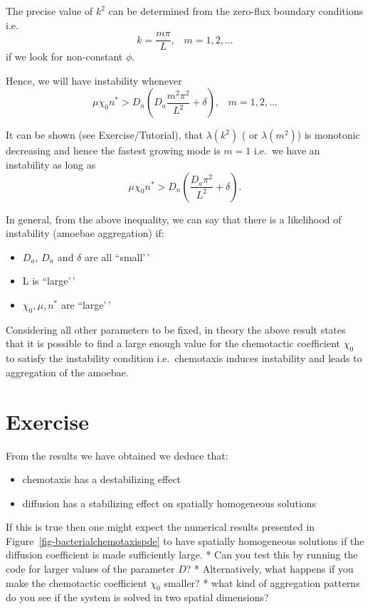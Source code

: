 \documentclass[
  letterpaper,
  DIV=11,
  numbers=noendperiod]{scrreprt}
\providecommand{\tightlist}{%
  \setlength{\itemsep}{0pt}\setlength{\parskip}{0pt}}\usepackage{longtable,booktabs,array}
\theoremstyle{definition}
\theoremstyle{plain}
\theoremstyle{plain}
\theoremstyle{remark}
\begin{document}
The precise value of \(k^2\) can be determined from the zero-flux
boundary conditions i.e. \[ 
k  =  \frac{m \pi}{L}, \;\;\; m = 1,2, \dots 
\] if we look for non-constant \(\phi\).

Hence, we will have instability whenever \[
\mu \chi_0 n^* >  D_n  \left( D_a \frac{m^2 \pi^2}{L^2} + \delta \right), \;\;\; m = 1,2, \dots
\]

It can be shown (see Exercise/Tutorial), that \(\lambda (k^2)\) ( or
\(\lambda (m^2)\)) is monotonic decreasing and hence the fastest growing
mode is \(m=1\) i.e.~we have an instability as long as \[
\mu \chi_0 n^* >  D_n  \left( \frac{D_a \pi^2}{L^2} + \delta \right).
\]

In general, from the above inequality, we can say that there is a
likelihood of instability (amoebae aggregation) if:

\begin{itemize}
\tightlist
\item
  \(D_a\), \(D_n\) and \(\delta\) are all ``small'\,'
\item
  L is ``large'\,'
\item
  \(\chi_0 , \mu , n^*\) are ``large'\,'
\end{itemize}

Considering all other parameters to be fixed, in theory the above result
states that it is possible to find a large enough value for the
chemotactic coefficient \(\chi_0\) to satisfy the instability condition
i.e.~chemotaxis induces instability and leads to aggregation of the
amoebae.

\hypertarget{exercise-1}{%
\section{Exercise}\label{exercise-1}}

From the results we have obtained we deduce that:

\begin{itemize}
\tightlist
\item
  chemotaxis has a destabilizing effect
\item
  diffusion has a stabilizing effect on spatially homogeneous solutions
\end{itemize}

If this is true then one might expect the numerical results presented in
Figure~\ref{fig-bacterialchemotaxispde} to have spatially homogeneous
solutions if the diffusion coefficient is made sufficiently large. * Can
you test this by running the code for larger values of the parameter
\(D\)? * Alternatively, what happens if you make the chemotactic
coefficient \(\chi_0\) smaller? * what kind of aggregation patterns do
you see if the system is solved in two spatial dimensions?
\end{document}
